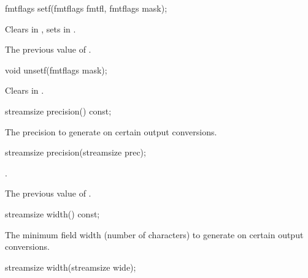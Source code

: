 %
\begin{itemdecl}
fmtflags setf(fmtflags fmtfl, fmtflags mask);
\end{itemdecl}

\begin{itemdescr}
\pnum
\effects
Clears  in
,
sets
in
.

\pnum
\returns
The previous value of
.
\end{itemdescr}

%
\begin{itemdecl}
void unsetf(fmtflags mask);
\end{itemdecl}

\begin{itemdescr}
\pnum
\effects
Clears  in
.
\end{itemdescr}

%
\begin{itemdecl}
streamsize precision() const;
\end{itemdecl}

\begin{itemdescr}
\pnum
\returns
The precision
to generate on certain output conversions.
\end{itemdescr}

%
\begin{itemdecl}
streamsize precision(streamsize prec);
\end{itemdecl}

\begin{itemdescr}
\pnum
\ensures
{}.

\pnum
\returns
The previous value of
.
\end{itemdescr}

%
\begin{itemdecl}
streamsize width() const;
\end{itemdecl}

\begin{itemdescr}
\pnum
\returns
The minimum field width (number of characters) to generate on certain output
conversions.
\end{itemdescr}

%
\begin{itemdecl}
streamsize width(streamsize wide);
\end{itemdecl}

